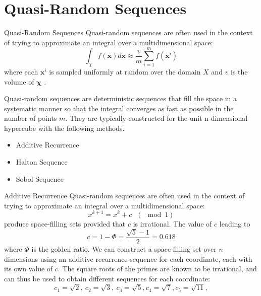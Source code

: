 \documentclass{beamer}
\begin{document}
\section{Quasi-Random Sequences}
\begin{frame}{Quasi-Random Sequences}
Quasi-random sequences are often used in the context of trying to approximate an integral over a multidimensional space:
\begin{equation*}
    \int_\chi f(\boldsymbol{x})d\boldsymbol{x} \approx \frac{v}{m}\sum_{i=1}^m f(\boldsymbol{x}^i)
\end{equation*}
where each $\boldsymbol{x}^i$ is sampled uniformly at random over the domain $X$ and $v$ is the volume of $\boldsymbol{\chi}$ .

Quasi-random sequences are deterministic sequences that fill the space in a systematic manner so that the integral converges as fast as possible in the number of points $m$. They are typically constructed for the unit n-dimensional hypercube with the following methods.
\begin{itemize}
    \item Additive Recurrence
    \item Halton Sequence
    \item Sobol Sequence
\end{itemize}
\end{frame}

\begin{frame}{Additive Recurrence}
Quasi-random sequences are often used in the context of trying to approximate an integral over a multidimensional space:
\begin{equation*}
    x^{k+1} = x^k + c ~~~(\mod 1)
\end{equation*}
produce space-filling sets provided that $c$ is irrational. The value of $c$ leading to
\begin{equation*}
    c = 1 - \Phi = \frac{\sqrt{5}-1}{2} = 0.618
\end{equation*}
where $\Phi$ is the golden ratio.
We can construct a space-filling set over $n$ dimensions using an additive recurrence sequence for each coordinate, each with its own value of $c$. The square roots of the primes are known to be irrational, and can thus be used to obtain different sequences for each coordinate:
\begin{equation*}
    c_1 =\sqrt{2}, ~c_2 =\sqrt{3}, ~c_3 =\sqrt{5}, c_4 =\sqrt{7}, c_5 =\sqrt{11},
\end{equation*}
\end{frame}
\end{document}
